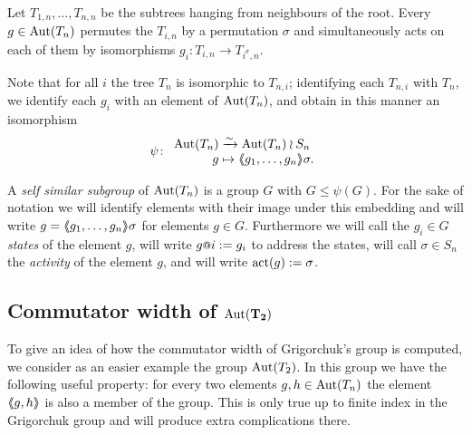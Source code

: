 \documentclass[a4paper,11pt]{amsart}
\begin{document}
Let $T_{1,n},\ldots,T_{n,n}$ be the subtrees hanging from neighbours of the root. 
Every $g\in\operatorname{{Aut}}(T_n)$ permutes the $T_{i,n}$ by a permutation $\sigma$ and simultaneously
acts on each of them by isomorphisms $g_i\colon T_{i,n}\to T_{i^\sigma,n}$.

Note that for all $i$ the tree $T_n$ is isomorphic to $T_{n,i}$; identifying each $T_{n,i}$ with $T_n$, we identify each $g_i$ with an element of $\operatorname{{Aut}}(T_n)$, and obtain in this manner an isomorphism
\[\psi\colon\begin{array}{r@{\;}l}
              \Aut(T_n) &\xrightarrow{\sim} \Aut(T_n)\wr S_n\\
              g &\mapsto \pair{g_1,\ldots,g_n}\sigma.
            \end{array}
\]

A \emph{self similar subgroup} of $\operatorname{{Aut}}(T_n)$ is a group $G$ with $G\leq \psi(G)$. 
For the sake of notation we will identify elements with their image under this embedding
and will write $g=\langle\negthickspace\langle g_1,\ldots,g_n\rangle\negthickspace\rangle\sigma$ for elements $g\in G$. 
Furthermore we will call the $g_i\in G$ \emph{states} of the element $g$,
will write $g\at{i}:=g_i$ to address the states, will
call $\sigma \in S_n$ the \emph{activity} of the element $g$, 
and will write $\operatorname{act}(g):= \sigma$. 


\subsection{Commutator width of \texorpdfstring{$\mathbf{\textup{Aut}(T_2)}$}{Aut(T2)} }
To give an idea of how the commutator width of Grigorchuk's group is computed,
we consider as an easier example the group $\operatorname{{Aut}}(T_2)$. In this group
we have the following useful property: for every two elements $g,h\in \operatorname{{Aut}}(T_n)$ the
element $\langle\negthickspace\langle g,h\rangle\negthickspace\rangle$ is also a member of the group.
This is only true up to finite index in the Grigorchuk group
and will produce extra complications there.
\end{document}
